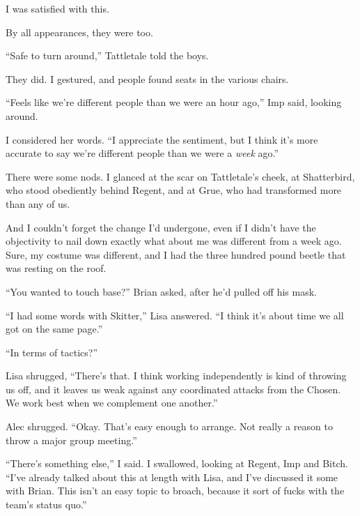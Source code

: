 I was satisfied with this.



By all appearances, they were too.



``Safe to turn around,'' Tattletale told the boys.



They did.  I gestured, and people found seats in the various chairs.



``Feels like we're different people than we were an hour ago,'' Imp said, looking around.



I considered her words.  ``I appreciate the sentiment, but I think it's more accurate to say we're different people than we were a \emph{week} ago.''



There were some nods.  I glanced at the scar on Tattletale's cheek, at Shatterbird, who stood obediently behind Regent, and at Grue, who had transformed more than any of us.



And I couldn't forget the change I'd undergone, even if I didn't have the objectivity to nail down exactly what about me was different from a week ago.  Sure, my costume was different, and I had the three hundred pound beetle that was resting on the roof.



``You wanted to touch base?'' Brian asked, after he'd pulled off his mask.



``I had some words with Skitter,'' Lisa answered.  ``I think it's about time we all got on the same page.''



``In terms of tactics?''



Lisa shrugged, ``There's that.  I think working independently is kind of throwing us off, and it leaves us weak against any coordinated attacks from the Chosen.  We work best when we complement one another.''



Alec shrugged.  ``Okay.  That's easy enough to arrange.  Not really a reason to throw a major group meeting.''



``There's something else,'' I said.  I swallowed, looking at Regent, Imp and Bitch.  ``I've already talked about this at length with Lisa, and I've discussed it some with Brian.  This isn't an easy topic to broach, because it sort of fucks with the team's status quo.''




